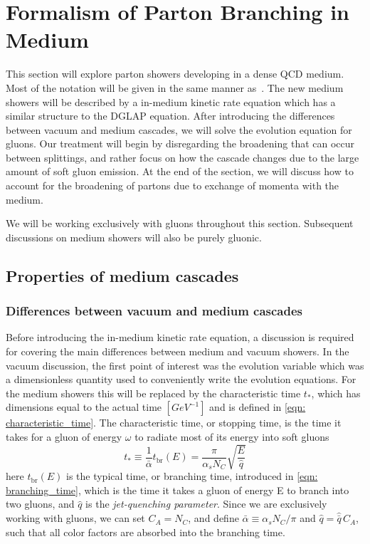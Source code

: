 \documentclass[main.tex]{subfiles}
\begin{document}
\section{Formalism of Parton Branching in Medium}
This section will explore parton showers developing in a dense QCD medium. Most of the notation will be given in the same manner as~\cite{Energy_flow_medium_cascade_2016}. The new medium showers will be described by a in-medium kinetic rate equation which has a similar structure to the DGLAP equation. After introducing the differences between vacuum and medium cascades, we will solve the evolution equation for gluons. Our treatment will begin by disregarding the broadening that can occur between splittings, and rather focus on how the cascade changes due to the large amount of soft gluon emission. At the end of the section, we will discuss how to account for the broadening of partons due to exchange of momenta with the medium.

We will be working exclusively with gluons throughout this section. Subsequent discussions on medium showers will also be purely gluonic.

\subsection{Properties of medium cascades}\label{sec: BDMPS_properties}
\subsubsection*{Differences between vacuum and medium cascades}
Before introducing the in-medium kinetic rate equation, a discussion is required for covering the main differences between medium and vacuum showers. In the vacuum discussion, the first point of interest was the evolution variable which was a dimensionless quantity used to conveniently write the evolution equations. For the medium showers this will be replaced by the characteristic time \(t_*\), which has dimensions equal to the actual time \([GeV^{-1}]\) and is defined in \autoref{eqn: characteristic_time}. The characteristic time, or stopping time, is the time it takes for a gluon of energy \(\omega\) to radiate most of its energy into soft gluons
\begin{equation}\label{eqn: characteristic_time}
    t_* \equiv \frac{1}{\bar \alpha} t_{\text{br}}(E) = \frac{\pi}{\alpha_s N_C} \sqrt{\frac{E}{\hat q}}
\end{equation}
here \(t_{\text{br}}(E)\) is the typical time, or branching time, introduced in \autoref{eqn: branching_time}, which is the time it takes a gluon of energy E to branch into two gluons, and \(\hat q\) is the \emph{jet-quenching parameter}. Since we are exclusively working with gluons, we can set \(C_A=N_C\), and define \(\bar \alpha \equiv \alpha_s N_C / \pi\) and \(\hat{q} = \hat{\bar q} \,C_A\), such that all color factors are absorbed into the branching time. 
\end{document}
